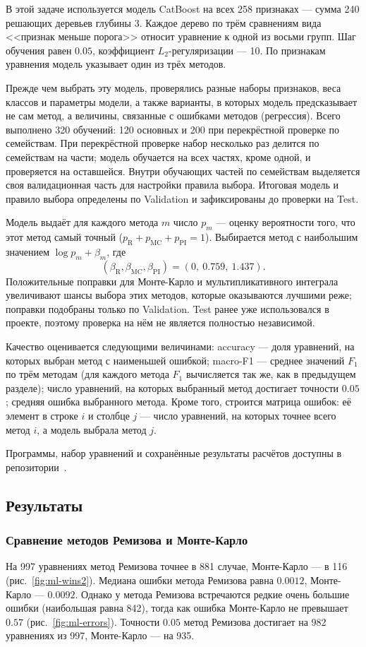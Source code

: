 \documentclass[14pt,a4paper]{extarticle}
\begin{document}
В этой задаче используется модель CatBoost на всех 258 признаках ---
сумма
240 решающих деревьев глубины 3. Каждое дерево по трём сравнениям вида
<<признак меньше порога>> относит уравнение к одной из восьми групп.
Шаг обучения равен $0.05$, коэффициент $L_2$-регуляризации --- 10.
По признакам уравнения модель указывает один из трёх методов.

Прежде чем выбрать эту модель, проверялись разные наборы признаков,
веса классов и параметры модели, а также варианты, в которых модель
предсказывает не сам метод, а величины, связанные с ошибками методов
(регрессия). Всего выполнено 320 обучений: 120 основных и 200
при перекрёстной проверке по семействам. При перекрёстной проверке
набор несколько раз делится по семействам на части; модель обучается
на всех частях, кроме одной, и проверяется на оставшейся. Внутри
обучающих частей по семействам выделяется своя валидационная часть
для настройки правила выбора. Итоговая модель и правило выбора
определены по Validation и зафиксированы до проверки на Test.

Модель выдаёт для каждого метода $m$ число $p_m$ --- оценку
вероятности того, что этот метод самый точный
($p_{\mathrm R}+p_{\mathrm{MC}}+p_{\mathrm{PI}}=1$). Выбирается метод
с наибольшим значением $\log p_m+\beta_m$, где
\[
(\beta_{\mathrm R},\beta_{\mathrm{MC}},\beta_{\mathrm{PI}})
=(0,\ 0.759,\ 1.437).
\]
Положительные поправки для Монте-Карло и мультипликативного интеграла
увеличивают шансы выбора этих методов, которые оказываются лучшими
реже; поправки подобраны только по Validation. Test ранее уже использовался
в проекте, поэтому проверка на нём не является полностью независимой.

Качество оценивается следующими величинами: accuracy --- доля уравнений,
на которых выбран метод с наименьшей ошибкой; macro-F1 --- среднее
значений $F_1$ по трём методам (для каждого метода $F_1$ вычисляется так
же, как в предыдущем разделе); число уравнений, на которых выбранный
метод достигает точности $0.05$; средняя ошибка выбранного метода.
Кроме того, строится матрица ошибок: её элемент в строке $i$ и столбце
$j$ --- число уравнений, на которых точнее всего метод $i$, а модель
выбрала метод $j$.

Программы, набор уравнений и сохранённые результаты расчётов доступны
в репозитории~\cite{repo2488}.

\subsection{Результаты}
\subsubsection{Сравнение методов Ремизова и Монте-Карло}
На 997 уравнениях метод Ремизова точнее в 881 случае, Монте-Карло ---
в 116 (рис.~\ref{fig:ml-wins2}). Медиана ошибки метода Ремизова равна
$0.0012$, Монте-Карло --- $0.0092$. Однако у метода Ремизова встречаются
редкие очень большие ошибки (наибольшая равна 842), тогда как ошибка
Монте-Карло не превышает $0.57$ (рис.~\ref{fig:ml-errors}). Точности
$0.05$ метод Ремизова достигает на 982 уравнениях из 997,
Монте-Карло --- на 935.
\end{document}

